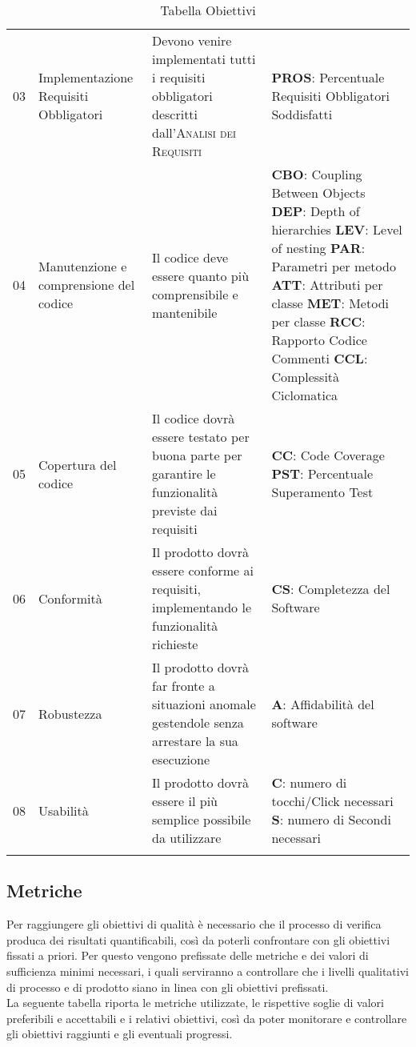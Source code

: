 \begin{longtable}{
		>{}p{}
		>{}p{}
        >{}p{}
        >{\centering}p{} }
        03 & Implementazione Requisiti Obbligatori & Devono venire implementati tutti i requisiti obbligatori descritti dall'\textsc{Analisi dei Requisiti} & \textbf{PROS}: Percentuale Requisiti Obbligatori Soddisfatti \tabularnewline

        04 & Manutenzione e comprensione del codice & Il codice deve essere quanto più comprensibile e mantenibile & \textbf{CBO}: Coupling Between Objects \newline \textbf{DEP}: Depth of hierarchies \newline \textbf{LEV}: Level of nesting \newline \textbf{PAR}: Parametri per metodo \newline \textbf{ATT}: Attributi per classe \newline \textbf{MET}: Metodi per classe \newline\textbf{RCC}: Rapporto Codice Commenti \newline\textbf{{CCL}}: Complessità Ciclomatica \tabularnewline

        05 & Copertura del codice & Il codice dovrà essere testato per buona parte per garantire le funzionalità previste dai requisiti &
        	\textbf{CC}: Code Coverage \newline
        	\textbf{PST}: Percentuale Superamento Test \tabularnewline

        06 & Conformità & Il prodotto dovrà essere conforme ai requisiti, implementando le funzionalità richieste & \textbf{CS}: Completezza del Software \tabularnewline

        07 & Robustezza & Il prodotto dovrà far fronte a situazioni anomale gestendole senza arrestare la sua esecuzione & \textbf{A}: Affidabilità del software \tabularnewline

        08 & Usabilità & Il prodotto dovrà essere il più semplice possibile da utilizzare & \textbf{C}: numero di tocchi/Click necessari \newline \textbf{S}: numero di Secondi necessari\tabularnewline
        \caption{Tabella Obiettivi}
    \end{longtable}


\pagebreak
\subsection{Metriche}
Per raggiungere gli obiettivi di qualità è necessario che il processo di verifica produca dei risultati quantificabili, così da poterli confrontare con gli obiettivi fissati a priori. Per questo vengono prefissate delle metriche e dei valori di sufficienza minimi necessari, i quali serviranno a controllare che i livelli qualitativi di processo e di prodotto siano in linea con gli obiettivi prefissati.\\La seguente tabella riporta le metriche utilizzate, le rispettive soglie di valori preferibili e accettabili e i relativi obiettivi, così da poter monitorare e controllare gli obiettivi raggiunti e gli eventuali progressi.

